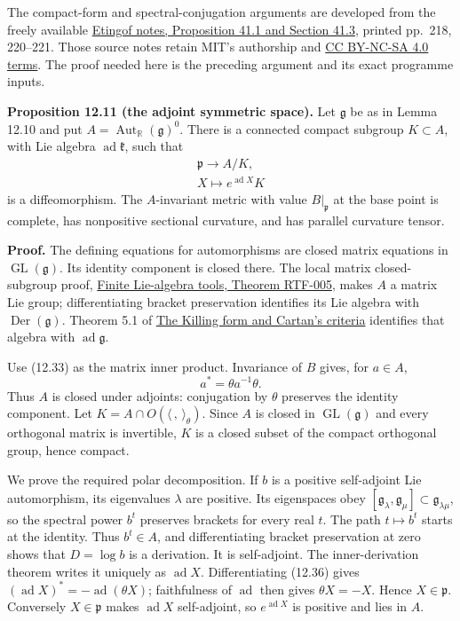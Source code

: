 \documentclass[
  11pt,
]{article}
\begin{document}
The compact-form and spectral-conjugation arguments are developed from
the freely available
\href{https://ocw.mit.edu/courses/18-755-lie-groups-and-lie-algebras-ii-spring-2024/mit18_755_s24_lec15.pdf}{Etingof
notes, Proposition 41.1 and Section 41.3}, printed pp.~218, 220--221.
Those source notes retain MIT's authorship and
\href{https://creativecommons.org/licenses/by-nc-sa/4.0/}{CC BY-NC-SA
4.0 terms}. The proof needed here is the preceding argument and its
exact programme inputs.

\textbf{Proposition 12.11 (the adjoint symmetric space).} Let
\(\mathfrak g\) be as in Lemma 12.10 and put
\(A=\operatorname{Aut}_{\mathbb R}(\mathfrak g)^0\). There is a
connected compact subgroup \(K\subset A\), with Lie algebra
\(\operatorname{ad}\mathfrak k\), such that \[
\begin{gathered}
\mathfrak p\longrightarrow A/K,\\
X\longmapsto e^{\operatorname{ad}X}K
\end{gathered}
\tag{12.35}
\] is a diffeomorphism. The \(A\)-invariant metric with value
\(B|_{\mathfrak p}\) at the base point is complete, has nonpositive
sectional curvature, and has parallel curvature tensor.

\textbf{Proof.} The defining equations for automorphisms are closed
matrix equations in \(\operatorname{GL}(\mathfrak g)\). Its identity
component is closed there. The local matrix closed-subgroup proof,
\href{supporting/RT-LIE/RT-LIE-foundations.html\#RTF-005}{Finite
Lie-algebra tools, Theorem RTF-005}, makes \(A\) a matrix Lie group;
differentiating bracket preservation identifies its Lie algebra with
\(\operatorname{Der}(\mathfrak g)\). Theorem 5.1 of
\href{supporting/RT-LIE/RT-LIE-03.html\#RTLIE03-T51}{The Killing form
and Cartan's criteria} identifies that algebra with
\(\operatorname{ad}\mathfrak g\).

Use (12.33) as the matrix inner product. Invariance of \(B\) gives, for
\(a\in A\), \[
a^*=\theta a^{-1}\theta.
\tag{12.36}
\] Thus \(A\) is closed under adjoints: conjugation by \(\theta\)
preserves the identity component. Let
\(K=A\cap O(\langle\, ,\,\rangle_\theta)\). Since \(A\) is closed in
\(\operatorname{GL}(\mathfrak g)\) and every orthogonal matrix is
invertible, \(K\) is a closed subset of the compact orthogonal group,
hence compact.

We prove the required polar decomposition. If \(b\) is a positive
self-adjoint Lie automorphism, its eigenvalues \(\lambda\) are positive.
Its eigenspaces obey
\([\mathfrak g_\lambda,\mathfrak g_\mu]\subset\mathfrak g_{\lambda\mu}\),
so the spectral power \(b^t\) preserves brackets for every real \(t\).
The path \(t\mapsto b^t\) starts at the identity. Thus \(b^t\in A\), and
differentiating bracket preservation at zero shows that \(D=\log b\) is
a derivation. It is self-adjoint. The inner-derivation theorem writes it
uniquely as \(\operatorname{ad}X\). Differentiating (12.36) gives
\((\operatorname{ad}X)^*=-\operatorname{ad}(\theta X)\); faithfulness of
\(\operatorname{ad}\) then gives \(\theta X=-X\). Hence
\(X\in\mathfrak p\). Conversely \(X\in\mathfrak p\) makes
\(\operatorname{ad}X\) self-adjoint, so \(e^{\operatorname{ad}X}\) is
positive and lies in \(A\).
\end{document}
